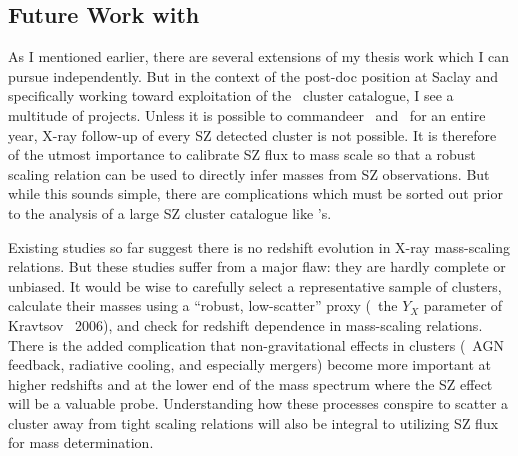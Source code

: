 \documentclass[11pt]{article}
\begin{document}
\subsection*{Future Work with \planck}

As I mentioned earlier, there are several extensions of my thesis work
which I can pursue independently. But in the context of the post-doc
position at Saclay and specifically working toward exploitation of
the \planck\ cluster catalogue, I see a multitude of projects. Unless
it is possible to commandeer \xmm\ and \chandra\ for an entire year,
X-ray follow-up of every SZ detected cluster is not possible. It is
therefore of the utmost importance to calibrate SZ flux to mass
scale so that a robust scaling relation can be used to directly infer
masses from SZ observations. But while this sounds simple, there are
complications which must be sorted out prior to the analysis of a
large SZ cluster catalogue like \planck's.

Existing studies so far suggest there is no redshift evolution in
X-ray mass-scaling relations. But these studies suffer from a major
flaw: they are hardly complete or unbiased. It would be wise to
carefully select a representative sample of clusters, calculate their
masses using a ``robust, low-scatter'' proxy (\eg\ the $Y_X$
parameter of Kravtsov \etal\ 2006), and check for redshift dependence
in mass-scaling relations. There is the added complication that
non-gravitational effects in clusters (\ie\ AGN feedback, radiative
cooling, and especially mergers) become more important at higher
redshifts and at the lower end of the mass spectrum where the SZ
effect will be a valuable probe. Understanding how these processes
conspire to scatter a cluster away from tight scaling relations will
also be integral to utilizing SZ flux for mass determination.
\end{document}
